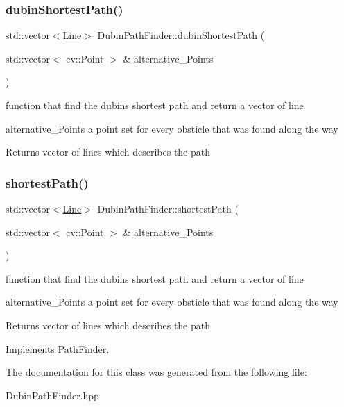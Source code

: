 \subsubsection{\texorpdfstring{dubin\+Shortest\+Path()}{dubinShortestPath()}}
{\footnotesize\ttfamily std\+::vector$<$\mbox{\hyperlink{class_line}{Line}}$>$ Dubin\+Path\+Finder\+::dubin\+Shortest\+Path (\begin{DoxyParamCaption}\item[{std\+::vector$<$ cv\+::\+Point $>$ \&}]{alternative\+\_\+\+Points }\end{DoxyParamCaption})}



function that find the dubins shortest path and return a vector of line 

\begin{DoxyItemize}
\item alternative\+\_\+\+Points a point set for every obsticle that was found along the way \begin{DoxyReturn}{Returns}
vector of lines which describes the path 
\end{DoxyReturn}
\end{DoxyItemize}
\mbox{\label{class_dubin_path_finder_adc5d730f6226c4d92202b0ff4126cbb2}} 
\subsubsection{\texorpdfstring{shortest\+Path()}{shortestPath()}}
{\footnotesize\ttfamily std\+::vector$<$\mbox{\hyperlink{class_line}{Line}}$>$ Dubin\+Path\+Finder\+::shortest\+Path (\begin{DoxyParamCaption}\item[{std\+::vector$<$ cv\+::\+Point $>$ \&}]{alternative\+\_\+\+Points }\end{DoxyParamCaption})\hspace{0.3cm}{\ttfamily [virtual]}}



function that find the dubins shortest path and return a vector of line 

\begin{DoxyItemize}
\item alternative\+\_\+\+Points a point set for every obsticle that was found along the way \begin{DoxyReturn}{Returns}
vector of lines which describes the path 
\end{DoxyReturn}
\end{DoxyItemize}


Implements \mbox{\hyperlink{class_path_finder_aee7b3017f8f532f9368d2d996d191a10}{Path\+Finder}}.



The documentation for this class was generated from the following file\+:\begin{DoxyCompactItemize}
\item 
Dubin\+Path\+Finder.\+hpp\end{DoxyCompactItemize}
